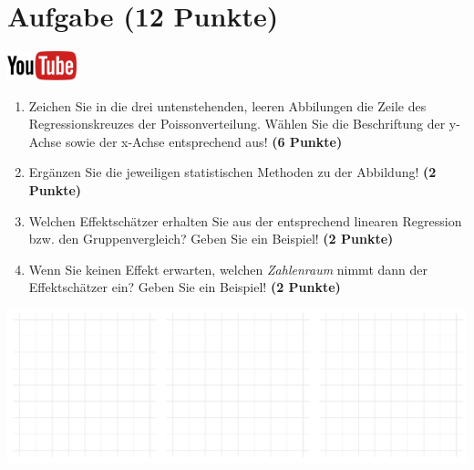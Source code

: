 \documentclass[a4paper, 9pt]{scrartcl}\usepackage[]{graphicx}\usepackage[]{xcolor}
\makeatletter
\def\maxwidth{ %
  \ifdim\Gin@nat@width>\linewidth
    \linewidth
  \else
    \Gin@nat@width
  \fi
}
\makeatother
\begin{document}
\clearpage

\section{Aufgabe \hfill (12 Punkte)}

\hfill\href{https://youtu.be/lHzRgm7hPw0}{\includegraphics[width =
  2cm]{img/youtube}}\\[1Ex]



\begin{enumerate}
\item Zeichen Sie in die drei untenstehenden, leeren Abbilungen die Zeile des
  Regressionskreuzes der Poissonverteilung. W{\"a}hlen Sie die Beschriftung der
  y-Achse sowie der x-Achse entsprechend aus! \textbf{(6 Punkte)}
\item Erg{\"a}nzen Sie die jeweiligen statistischen Methoden zu der Abbildung! \textbf{(2 Punkte)}
\item Welchen Effektsch{\"a}tzer erhalten Sie aus der entsprechend linearen
  Regression bzw. den Gruppenvergleich? Geben Sie ein Beispiel! \textbf{(2 Punkte)}
\item Wenn Sie keinen Effekt erwarten, welchen \textit{Zahlenraum} nimmt dann
  der Effektsch{\"a}tzer ein? Geben Sie ein Beispiel! \textbf{(2 Punkte)}
\end{enumerate}



{\centering \includegraphics[width=\maxwidth]{img/regression-01-1} 

}



 
\clearpage
\end{document}
